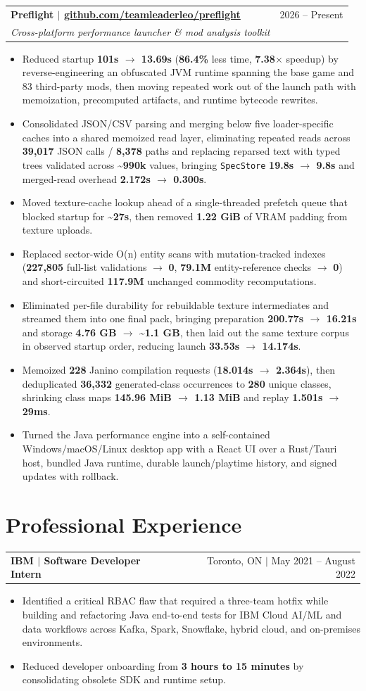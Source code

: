 \documentclass[letterpaper,11pt]{article}
\makeatletter
\newcommand{\resumeHeading}[4]{%
  \begin{tabularx}{\textwidth}{@{}Xr@{}}
    \textbf{#1} & #2 \\
    \textit{\small #3} & \textit{\small #4}
  \end{tabularx}\vspace{-2pt}
}
\newcommand{\resumeHeadingSimple}[2]{%
  \begin{tabularx}{\textwidth}{@{}Xr@{}}
    \textbf{#1} & #2
  \end{tabularx}\vspace{-0.25pt}
}
\newcommand{\resumeItemListStart}{\begin{itemize}[leftmargin=0.23in,itemsep=1.2pt,parsep=0pt,topsep=1.0pt]}
\newcommand{\resumeItem}[1]{\item\fontsize{10.6pt}{12.2pt}\selectfont #1}
\newcommand{\resumeItemListEnd}{\end{itemize}\vspace{-0.25pt}}
\makeatother
\begin{document}
\resumeHeading
  {Preflight $|$ \href{https://github.com/teamleaderleo/preflight}{github.com/teamleaderleo/preflight}}
  {2026 -- Present}
  {\normalfont Cross-platform performance launcher \& mod analysis toolkit}
  {}
\resumeItemListStart
  \resumeItem{Reduced startup \textbf{101s $\rightarrow$ 13.69s} (\textbf{86.4\%} less time, \textbf{7.38$\times$} speedup) by reverse-engineering an obfuscated JVM runtime spanning the base game and 83 third-party mods, then moving repeated work out of the launch path with memoization, precomputed artifacts, and runtime bytecode rewrites.}
  \resumeItem{Consolidated JSON/CSV parsing and merging below five loader-specific caches into a shared memoized read layer, eliminating repeated reads across \textbf{39,017} JSON calls / \textbf{8,378} paths and replacing reparsed text with typed trees validated across \textbf{\textasciitilde990k} values, bringing \texttt{SpecStore} \textbf{19.8s $\rightarrow$ 9.8s} and merged-read overhead \textbf{2.172s $\rightarrow$ 0.300s}.}
  \resumeItem{Moved texture-cache lookup ahead of a single-threaded prefetch queue that blocked startup for \textbf{\textasciitilde27s}, then removed \textbf{1.22 GiB} of VRAM padding from texture uploads.}
  \resumeItem{Replaced sector-wide O(n) entity scans with mutation-tracked indexes (\textbf{227,805} full-list validations $\rightarrow$ \textbf{0}, \textbf{79.1M} entity-reference checks $\rightarrow$ \textbf{0}) and short-circuited \textbf{117.9M} unchanged commodity recomputations.}
  \resumeItem{Eliminated per-file durability for rebuildable texture intermediates and streamed them into one final pack, bringing preparation \textbf{200.77s $\rightarrow$ 16.21s} and storage \textbf{4.76 GB $\rightarrow$ \textasciitilde1.1 GB}, then laid out the same texture corpus in observed startup order, reducing launch \textbf{33.53s $\rightarrow$ 14.174s}.}
  \resumeItem{Memoized \textbf{228} Janino compilation requests (\textbf{18.014s $\rightarrow$ 2.364s}), then deduplicated \textbf{36,332} generated-class occurrences to \textbf{280} unique classes, shrinking class maps \textbf{145.96 MiB $\rightarrow$ 1.13 MiB} and replay \textbf{1.501s $\rightarrow$ 29ms}.}
  \resumeItem{Turned the Java performance engine into a self-contained Windows/macOS/Linux desktop app with a React UI over a Rust/Tauri host, bundled Java runtime, durable launch/playtime history, and signed updates with rollback.}
\resumeItemListEnd

\section{Professional Experience}
\resumeHeadingSimple
  {IBM $|$ Software Developer Intern}
  {Toronto, ON $|$ May 2021 -- August 2022}
\resumeItemListStart
  \resumeItem{Identified a critical RBAC flaw that required a three-team hotfix while building and refactoring Java end-to-end tests for IBM Cloud AI/ML and data workflows across Kafka, Spark, Snowflake, hybrid cloud, and on-premises environments.}
  \resumeItem{Reduced developer onboarding from \textbf{3 hours to 15 minutes} by consolidating obsolete SDK and runtime setup.}
\resumeItemListEnd
\end{document}
